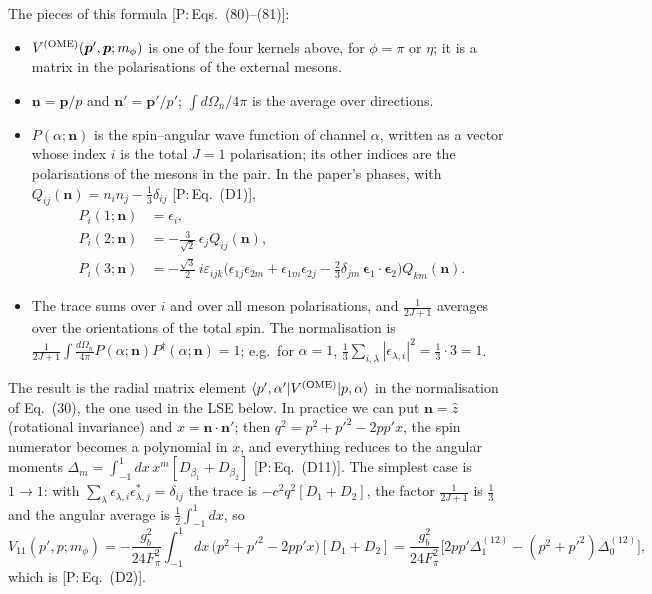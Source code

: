 \documentclass[11pt]{article}
\newcommand{\tagP}[1]{\textcolor{blue!65!black}{\textsf{\small[P:\,#1]}}}
\newenvironment{aiadd}{\par}{\par}
\begin{document}
\begin{aiadd}
	The pieces of this formula \tagP{Eqs.~(80)--(81)}:
	\begin{itemize}
		\item $V^{(\rm OME)}(\bm p',\bm p;m_\phi)$ is one of the four kernels above, for $\phi=\pi$ or $\eta$; it is a matrix in the polarisations of the external mesons.
		\item $\bm n=\bm p/p$ and $\bm n'=\bm p'/p'$; $\int d\Omega_n/4\pi$ is the average over directions.
		\item $P(\alpha;\bm n)$ is the spin--angular wave function of channel $\alpha$, written as a vector whose index $i$ is the total $J=1$ polarisation; its other indices are the polarisations of the mesons in the pair. In the paper's phases, with $Q_{ij}(\bm n)=n_in_j-\frac13\delta_{ij}$ \tagP{Eq.~(D1)},
		      \begin{align*}
			      P_i(1;\bm n) & =\epsilon_i,                                                                                                                                                            \\
			      P_i(2;\bm n) & =-\frac{3}{\sqrt2}\,\epsilon_jQ_{ij}(\bm n),                                                                                                                            \\
			      P_i(3;\bm n) & =-\frac{\sqrt3}{2}\,i\varepsilon_{ijk}\Big(\epsilon_{1j}\epsilon_{2m}+\epsilon_{1m}\epsilon_{2j}-\frac23\delta_{jm}\,\bm\epsilon_1\cdot\bm\epsilon_2\Big)Q_{km}(\bm n).
		      \end{align*}
		\item The trace sums over $i$ and over all meson polarisations, and $\frac{1}{2J+1}$ averages over the orientations of the total spin. The normalisation is $\frac{1}{2J+1}\int\frac{d\Omega_n}{4\pi}P(\alpha;\bm n)P^\dagger(\alpha;\bm n)=1$; e.g.\ for $\alpha=1$, $\frac13\sum_{i,\lambda}|\epsilon_{\lambda,i}|^2=\frac13\cdot3=1$.
	\end{itemize}
	The result is the radial matrix element $\braket{p',\alpha'|V^{(\rm OME)}|p,\alpha}$ in the normalisation of Eq.~(30), the one used in the LSE below. In practice we can put $\bm n=\hat z$ (rotational invariance) and $x=\bm n\cdot\bm n'$; then $q^2=p^2+p'^2-2pp'x$, the spin numerator becomes a polynomial in $x$, and everything reduces to the angular moments $\Delta_m=\int_{-1}^1dx\,x^m[D_{\beta_1}+D_{\beta_2}]$ \tagP{Eq.~(D11)}. The simplest case is $1\to1$: with $\sum_\lambda\epsilon_{\lambda,i}\epsilon^*_{\lambda,j}=\delta_{ij}$ the trace is $-c^2q^2[D_1+D_2]$, the factor $\frac{1}{2J+1}$ is $\frac13$ and the angular average is $\frac12\int_{-1}^1dx$, so
	\[
		V_{11}(p',p;m_\phi)=-\frac{g_b^2}{24F_\pi^2}\int_{-1}^1dx\,\big(p^2+p'^2-2pp'x\big)[D_1+D_2]
		=\frac{g_b^2}{24F_\pi^2}\Big[2pp'\Delta^{(12)}_1-(p^2+p'^2)\Delta^{(12)}_0\Big],
	\]
	which is \tagP{Eq.~(D2)}.
\end{aiadd}
\end{document}
